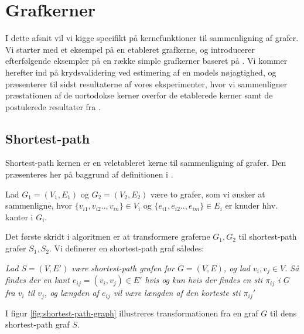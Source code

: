 \documentclass{article}
\begin{document}
\section{Grafkerner}
I dette afsnit vil vi kigge specifikt på kernefunktioner til sammenligning af grafer. Vi starter med et eksempel på en etableret grafkerne, og introducerer efterfølgende eksempler på en række simple grafkerner baseret på \cite{trivial-kernels}. Vi kommer herefter ind på krydsvalidering ved estimering af en models nøjagtighed, og præsenterer til sidst resultaterne af vores eksperimenter, hvor vi sammenligner præstationen af de uortodokse kerner overfor de etablerede kerner samt de postulerede resultater fra \cite{trivial-kernels}.

\subsection{Shortest-path}
Shortest-path kernen er en veletableret kerne til sammenligning af grafer. Den præsenteres her på baggrund af definitionen i \cite{shortest-path}. 

Lad $G_1=(V_1,E_1)$ og $G_2=(V_2,E_2)$ være to grafer, som vi ønsker at sammenligne, hvor $\{v_{i1},v_{i2}..,v_{in}\}\in V_i$ og $\{e_{i1},e_{i2}..,e_{im}\}\in E_i$ er knuder hhv. kanter i $G_i$.

Det første skridt i algoritmen er at transformere graferne $G_1,G_2$ til shortest-path grafer $S_1,S_2$. Vi definerer en shortest-path graf således:

\textit{Lad $S=(V,E')$ være shortest-path grafen for $G=(V,E)$, og lad $v_i,v_j\in V$. Så findes der en kant $e_{ij}=(v_i,v_j)\in E'$ hvis og kun hvis der findes en sti $\pi_{ij}$ i $G$ fra $v_i$ til $v_j$, og længden af $e_{ij}$ vil være længden af den korteste sti $\pi_{ij}'$}

I figur \ref{fig:shortest-path-graph} illustreres transformationen fra en graf $G$ til dens shortest-path graf $S$.
\end{document}
